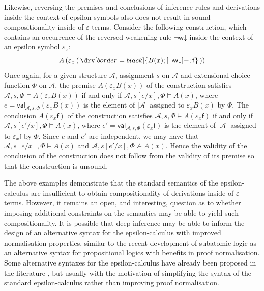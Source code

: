 \documentclass[10pt]{article}
\theoremstyle{definition}\newtheorem{remark}[theorem]{Remark}
\theoremstyle{definition}\newtheorem{example}[theorem]{Example}
\theoremstyle{definition}\newtheorem{definition}[theorem]{Definition}
\newcommand{\wDown}{{\mathsf{w\mathord\downarrow}}}
\newcommand{\falseUnit}{\mathsf{f}}
\begin{document}
	Likewise, reversing the premises and conclusions of inference rules and derivations inside the context of epsilon symbols also does not result in sound compositionality inside of $\varepsilon$-terms. Consider the following construction, which contains an occurrence of the reversed weakening rule $\neg \wDown$ inside the context of an epsilon symbol $\varepsilon_x$:
	\[
	A \left(\varepsilon_x \left( \, \drv[border=black] {
		B(x) ; [\neg \wDown]- ; \falseUnit
	} \, \right)\right)
	\]
	Once again, for a given structure $\mathcal{A}$, assignment $s$ on $\mathcal{A}$ and extensional choice function $\Phi$ on $\mathcal{A}$, the premise $A(\varepsilon_x B(x))$ of the construction satisfies $\mathcal{A}, s, \Phi \models A(\varepsilon_x B(x))$ if and only if $\mathcal{A}, s[e / x], \Phi \models A(x)$, where $e = \mathsf{val}_{\mathcal{A}, s, \Phi}(\varepsilon_x B(x))$ is the element of $| \mathcal{A} |$ assigned to $\varepsilon_x B(x)$ by $\Phi$. The conclusion $A(\varepsilon_x \falseUnit)$ of the construction satisfies $\mathcal{A}, s, \Phi \models A(\varepsilon_x \falseUnit)$ if and only if $\mathcal{A}, s[e' / x], \Phi \models A(x)$, where $e' = \mathsf{val}_{\mathcal{A}, s, \Phi}(\varepsilon_x \falseUnit)$ is the element of $| \mathcal{A} |$ assigned to $\varepsilon_x \falseUnit$ by $\Phi$. Since $e$ and $e'$ are independent, we may have that $\mathcal{A}, s[e / x], \Phi \models A(x)$ and $\mathcal{A}, s[e' / x], \Phi \nvDash A(x)$. Hence the validity of the conclusion of the construction does not follow from the validity of its premise so that the construction is unsound.
	
	The above examples demonstrate that the standard semantics of the epsilon-calculus are insufficient to obtain compositionality of derivations inside of $\varepsilon$-terms. However, it remains an open, and interesting, question as to whether imposing additional constraints on the semantics may be able to yield such compositionality. It is possible that deep inference may be able to inform the design of an alternative syntax for the epsilon-calculus with improved normalisation properties, similar to the recent development of subatomic logic \cite{AndreaThesis, AndreaAlessioSplittableSystems} as an alternative syntax for propositional logics with benefits in proof normalisation. Some alternative syntaxes for the epsilon-calculus have already been proposed in the literature \cite{DavisFectherFreeVariable, FechterThesis, BaazEpsilon}, but usually with the motivation of simplifying the syntax of the standard epsilon-calculus rather than improving proof normalisation.
	
\end{document}
